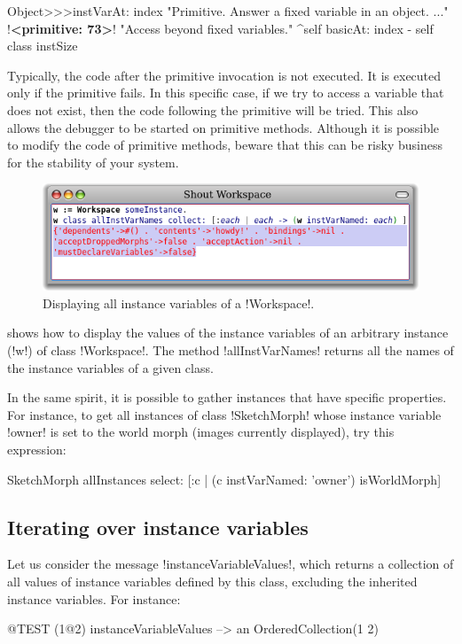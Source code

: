 \documentclass[a4paper,10pt,twoside]{book}
\begin{document}
\begin{code}{}
Object>>>instVarAt: index 
	"Primitive. Answer a fixed variable in an object. ..."
	!\textbf{<primitive: 73>}!
	"Access beyond fixed variables."
	^self basicAt: index - self class instSize		
\end{code}

Typically, the code after the primitive invocation is not executed.
It is executed only if the primitive fails. In this specific case, if we try to access a variable that does not exist, then the code following the primitive will be tried.
This also allows the debugger to be started on primitive methods.
Although it is possible to modify the code of primitive methods, beware that this can be risky business for the stability of your \pharo system.

\begin{figure}[ht]\centering
	\includegraphics[width=0.8\linewidth]{allInstanceVariables}
	\caption{Displaying all instance variables of a \ct!Workspace!.\label{fig:allInstanceVariables}}
\end{figure}

 shows how to display the values of the instance variables of an arbitrary instance (\ct!w!) of class \ct!Workspace!.
The method \ct!allInstVarNames! returns all the names of the instance variables of a given class.

In the same spirit, it is possible to gather instances that have specific properties.
For instance, to get all instances of class \ct!SketchMorph! whose instance variable \ct!owner! is set to the world morph (\ie images currently displayed), try this expression:
\begin{code}{}
SketchMorph allInstances select: [:c | (c instVarNamed: 'owner') isWorldMorph]
\end{code}

\subsection{Iterating over instance variables}

Let us consider the message \ct!instanceVariableValues!, which returns a collection of all values of instance variables defined by this class, excluding the inherited instance variables.
For instance:
\begin{code}{@TEST}
(1@2) instanceVariableValues --> an OrderedCollection(1 2)
\end{code}
\end{document}
